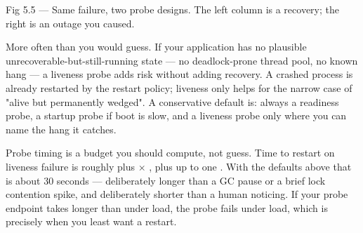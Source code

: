 \begin{wbfigure}{Fig 5.5 — Same failure, two probe designs. The left column is a recovery; the right is an outage you caused.}
\end{wbfigure}

 More often than you would guess. If your application has no plausible unrecoverable-but-still-running state --- no deadlock-prone thread pool, no known hang --- a liveness probe adds risk without adding recovery. A crashed process is already restarted by the restart policy; liveness only helps for the narrow case of "alive but permanently wedged". A conservative default is: always a readiness probe, a startup probe if boot is slow, and a liveness probe only where you can name the hang it catches.

\begin{perfnote}
Probe timing is a budget you should compute, not guess. Time to restart on liveness failure is roughly  plus  $\times$ , plus up to one . With the defaults above that is about 30 seconds --- deliberately longer than a GC pause or a brief lock contention spike, and deliberately shorter than a human noticing. If your probe endpoint takes longer than  under load, the probe fails under load, which is precisely when you least want a restart.
\end{perfnote}

